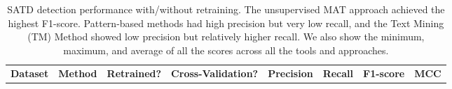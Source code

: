 \begin{table}[ht!]
\centering
\caption{SATD detection performance with/without retraining. The unsupervised MAT approach achieved the highest F1-score. Pattern-based methods had high precision but very low recall, and the Text Mining (TM) Method showed low precision but relatively higher recall. We also show the minimum, maximum, and average of all the scores across all the tools and approaches.}
\label{table:non_llm_satd_detection_result}
\begin{adjustbox}{max width=\textwidth, max height=\textheight}
\begin{tabular}{cccccccc}
\toprule
\textbf{Dataset} & \textbf{Method} & \textbf{Retrained?} & \textbf{Cross-Validation?} & \textbf{Precision} & \textbf{Recall} & \textbf{F1-score} & \textbf{MCC}\\


\end{tabular}
\end{adjustbox}
\end{table}
